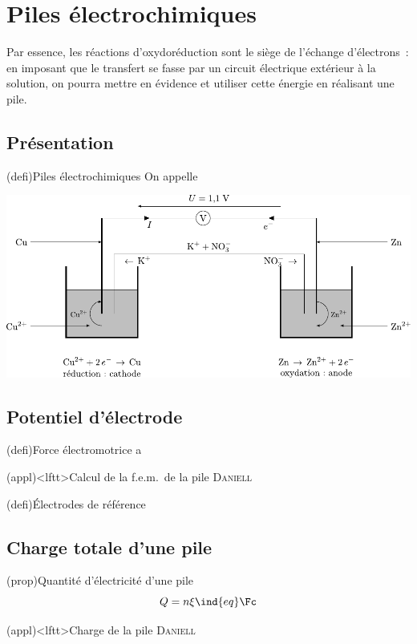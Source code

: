 \documentclass[../../main/main.tex]{subfiles}
\begin{document}
\section{Piles électrochimiques}
Par essence, les réactions d'oxydoréduction sont le siège de l'échange
d'électrons~: en imposant que le transfert se fasse par un circuit électrique
extérieur à la solution, on pourra mettre en évidence et utiliser cette énergie
en réalisant une pile.

\subsection{Présentation}
\begin{tcb*}(defi){Piles électrochimiques}
  On appelle
\end{tcb*}

\begin{center}
  \includegraphics[width=\linewidth]{pile_cu-zn}
\end{center}

\subsection{Potentiel d'électrode}
\begin{tcb*}(defi){Force électromotrice}
  a
\end{tcb*}

\begin{tcb*}(appl)<lftt>{Calcul de la f.e.m.\ de la pile \textsc{Daniell}}
    
\end{tcb*}

\begin{tcb*}(defi){Électrodes de référence}
  
\end{tcb*}

\subsection{Charge totale d'une pile}

\begin{tcb*}(prop){Quantité d'électricité d'une pile}
  \[
    Q = n \xi\ind{eq}\Fc
  \]
\end{tcb*}

\begin{tcb*}(appl)<lftt>{Charge de la pile \textsc{Daniell}}
    
\end{tcb*}
\end{document}
